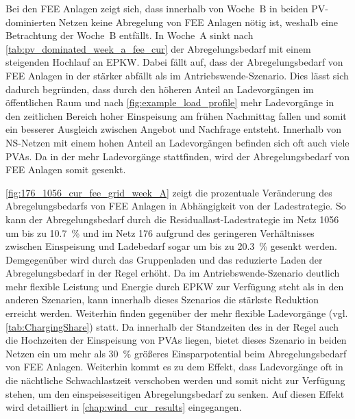 


Bei den \gls{FEE} Anlagen zeigt sich, dass innerhalb von Woche~B in beiden \gls{PV}-dominierten Netzen keine Abregelung von \gls{FEE} Anlagen nötig ist, weshalb eine Betrachtung der Woche~B entfällt.
In Woche~A sinkt nach \autoref{tab:pv_dominated_week_a_fee_cur} der Abregelungsbedarf mit einem steigenden Hochlauf an \gls{EPKW}.
Dabei fällt auf, dass der Abregelungsbedarf von \gls{FEE} Anlagen in der \SzeFirmenparkplatz stärker abfällt als im Antriebswende-Szenario.
Dies lässt sich dadurch begründen, dass durch den höheren Anteil an Ladevorgängen im öffentlichen Raum und \zH nach \autoref{fig:example_load_profile} mehr Ladevorgänge in den zeitlichen Bereich hoher Einspeisung am frühen Nachmittag fallen und somit ein besserer Ausgleich zwischen Angebot und Nachfrage entsteht.
Innerhalb von \gls{NS}-Netzen mit einem hohen Anteil an Ladevorgängen \zH befinden sich oft auch viele \glspl{PVA}.
Da in der \SzeFirmenparkplatz mehr Ladevorgänge \zH stattfinden, wird der Abregelungsbedarf von \gls{FEE} Anlagen somit gesenkt.



\autoref{fig:176_1056_cur_fee_grid_week_A} zeigt die prozentuale Veränderung des Abregelungsbedarfs von \gls{FEE} Anlagen in Abhängigkeit von der Ladestrategie.
So kann der Abregelungsbedarf durch die Residuallast-Ladestrategie im Netz \num{1056} um bis zu \SI{10.7}{\percent} und im Netz \num{176} aufgrund des geringeren Verhältnisses zwischen Einspeisung und Ladebedarf sogar um bis zu \SI{20.3}{\percent} gesenkt werden.
Demgegenüber wird durch das Gruppenladen und das reduzierte Laden der Abregelungsbedarf in der Regel erhöht.
Da im Antriebswende-Szenario deutlich mehr flexible Leistung und Energie durch \gls{EPKW} zur Verfügung steht als in den anderen Szenarien, kann innerhalb dieses Szenarios die stärkste Reduktion erreicht werden.
Weiterhin finden gegenüber der \SzeFirmenparkplatz mehr flexible Ladevorgänge (vgl. \autoref{tab:ChargingShare}) statt.
Da innerhalb der Standzeiten des \UC \Firmeparkplatz in der Regel auch die Hochzeiten der Einspeisung von \glspl{PVA} liegen, bietet dieses Szenario in beiden Netzen ein um mehr als \SI{30}{\percent} größeres Einsparpotential beim Abregelungsbedarf von \gls{FEE} Anlagen.
Weiterhin kommt es zu dem Effekt, dass Ladevorgänge \zH oft in die nächtliche Schwachlastzeit verschoben werden und somit nicht zur Verfügung stehen, um den einspeiseseitigen Abregelungsbedarf zu senken.
Auf diesen Effekt wird detailliert in \autoref{chap:wind_cur_results} eingegangen.

